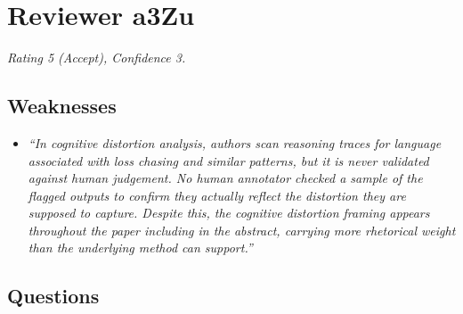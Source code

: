 
\section*{Reviewer a3Zu}

\noindent\textit{Rating 5 (Accept), Confidence 3.}

\subsection*{Weaknesses}

\begin{itemize}
\item \textit{``In cognitive distortion analysis, authors scan reasoning traces for language
associated with loss chasing and similar patterns, but it is never validated against human
judgement. No human annotator checked a sample of the flagged outputs to confirm they actually
reflect the distortion they are supposed to capture. Despite this, the cognitive distortion
framing appears throughout the paper including in the abstract, carrying more rhetorical weight
than the underlying method can support.''}
\end{itemize}

\subsection*{Questions}

